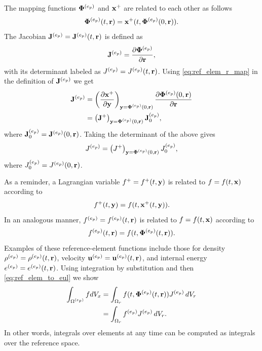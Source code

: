 \documentclass[11pt]{report}
\begin{document}
The mapping functions $\bm \Phi^{(e_p)}$ and $\mathbf{x}^+$ are related to each other as follows
\begin{equation}
    \label{eq:ref_elem_r_map}
    \bm \Phi^{(e_p)}(t,\mathbf{r}) = \mathbf{x}^+(t, \bm \Phi^{(e_p)}(0,\mathbf{r})).
\end{equation}
The Jacobian $\mathbf{J}^{(e_p)} = \mathbf{J}^{(e_p)}(t,\mathbf{r})$ is defined as 
\begin{equation}
    \mathbf{J}^{(e_p)} = \frac{ \partial \bm \Phi^{(e_p)} }{ \partial \mathbf{r} },
\end{equation}
with its determinant labeled as $J^{(e_p)} = J^{(e_p)}(t,\mathbf{r})$. Using \cref{eq:ref_elem_r_map} in the definition of $\mathbf{J}^{(e_p)}$ we get
\begin{align*}
    \mathbf{J}^{(e_p)} &= \left ( \frac{\partial \mathbf{x}^+}{\partial \mathbf{y}} \right )_{\mathbf{y} = \bm \Phi^{(e_p)}(0,\mathbf{r})} \frac{\partial \bm \Phi^{(e_p)}(0,\mathbf{r})}{\partial \mathbf{r}} \nonumber \\
    &= \left ( \mathbf{J}^+ \right )_{\mathbf{y} = \bm \Phi^{(e_p)}(0,\mathbf{r})} \mathbf{J}^{(e_p)}_0,
\end{align*}
where $\mathbf{J}^{(e_p)}_0 = \mathbf{J}^{(e_p)}(0,\mathbf{r})$.
Taking the determinant of the above gives
\begin{equation}
    \label{eq:ref_elem_det_J}
    J^{(e_p)} = \left ( J^+ \right )_{\mathbf{y} = \bm \Phi^{(e_p)}(0,\mathbf{r})} J^{(e_p)}_0,
\end{equation}
where $J^{(e_p)}_0 = J^{(e_p)}(0,\mathbf{r})$.

As a reminder, a Lagrangian variable $f^+=f^+(t,\mathbf{y})$ is related to $f=f(t,\mathbf{x})$ according to 
\begin{equation*}
    f^+(t,\mathbf{y}) = f(t,\mathbf{x}^+(t,\mathbf{y})).
\end{equation*}
In an analogous manner, $f^{(e_p)}=f^{(e_p)}(t,\mathbf{r})$ is related to $f=f(t,\mathbf{x})$ according to
\begin{equation}
    \label{eq:ref_elem_to_eul}
    f^{(e_p)}(t,\mathbf{r}) = f(t,\bm \Phi^{(e_p)}(t,\mathbf{r})).
\end{equation}
Examples of these reference-element functions include those for density $\rho^{(e_p)} = \rho^{(e_p)}(t,\mathbf{r})$, velocity $\mathbf{u}^{(e_p)} = \mathbf{u}^{(e_p)}(t,\mathbf{r})$, and internal energy $e^{(e_p)} = e^{(e_p)}(t,\mathbf{r})$. Using integration by substitution and then \cref{eq:ref_elem_to_eul} we show 
\begin{align*}
    \int_{\Omega^{(e_p)}} f dV_x &= \int_{\Omega_r} f(t, \bm \Phi^{(e_p)}(t,\mathbf{r})) J^{(e_p)} \, dV_r \nonumber \\
    &= \int_{\Omega_r} f^{(e_p)} J^{(e_p)} \, dV_r.
\end{align*}
In other words, integrals over elements at any time can be computed as integrals over the reference space. 
\end{document}
